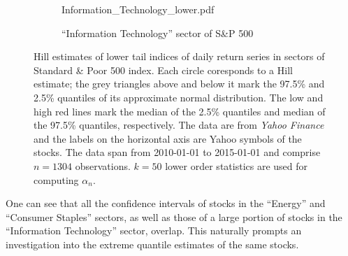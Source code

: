 \documentclass{article}
\begin{document}
\begin{figure}[htb!]
\begin{subfigure}[b]{\linewidth}
                    {Information_Technology_lower.pdf}
    \caption{``Information Technology'' sector of S\&P 500}
    \label{fig:Information_Technology_lower}
  \end{subfigure}
  \caption{\small Hill estimates of lower tail indices of
    daily return series in sectors of Standard \& Poor
    500 index. Each circle coresponds to a Hill estimate; the grey
    triangles above and below it mark the 97.5\% and 2.5\% quantiles
    of its approximate normal distribution.
    The low and high red lines mark the median of the 2.5\% quantiles
    and median of the 97.5\% quantiles, respectively.
    The data are from {\it Yahoo Finance} and the labels on
    the horizontal axis are Yahoo symbols of the stocks. The data span
    from 2010-01-01 to 2015-01-01 and comprise $n=1304$
    observations. $k=50$ lower order statistics are used
    for computing $\alpha_n$. 
  }
\end{figure}
One can see that all the confidence intervals of stocks in the
``Energy'' and ``Consumer Staples'' sectors, as well as those of a
large portion of stocks in the ``Information Technology'' sector,
overlap. This naturally prompts an investigation into the extreme
quantile estimates of the same stocks.






\end{document}
